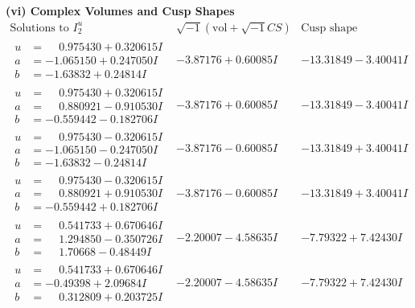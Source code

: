 \documentclass[1p]{elsarticle_modified}
\theoremstyle{definition}
\newcommand{\I}{\sqrt{-1}}
\begin{document}
\newpage\flushleft \textbf{(vi) Complex Volumes and Cusp Shapes}
$$\begin{array}{c|c|c}  
\text{Solutions to }I^u_{2}& \I (\text{vol} + \sqrt{-1}CS) & \text{Cusp shape}\\
 \hline 
\begin{aligned}
u &= \phantom{-}0.975430 + 0.320615 I \\
a &= -1.065150 + 0.247050 I \\
b &= -1.63832 + 0.24814 I\end{aligned}
 & -3.87176 + 0.60085 I & -13.31849 - 3.40041 I \\ \hline\begin{aligned}
u &= \phantom{-}0.975430 + 0.320615 I \\
a &= \phantom{-}0.880921 - 0.910530 I \\
b &= -0.559442 - 0.182706 I\end{aligned}
 & -3.87176 + 0.60085 I & -13.31849 - 3.40041 I \\ \hline\begin{aligned}
u &= \phantom{-}0.975430 - 0.320615 I \\
a &= -1.065150 - 0.247050 I \\
b &= -1.63832 - 0.24814 I\end{aligned}
 & -3.87176 - 0.60085 I & -13.31849 + 3.40041 I \\ \hline\begin{aligned}
u &= \phantom{-}0.975430 - 0.320615 I \\
a &= \phantom{-}0.880921 + 0.910530 I \\
b &= -0.559442 + 0.182706 I\end{aligned}
 & -3.87176 - 0.60085 I & -13.31849 + 3.40041 I \\ \hline\begin{aligned}
u &= \phantom{-}0.541733 + 0.670646 I \\
a &= \phantom{-}1.294850 - 0.350726 I \\
b &= \phantom{-}1.70668 - 0.48449 I\end{aligned}
 & -2.20007 - 4.58635 I & -7.79322 + 7.42430 I \\ \hline\begin{aligned}
u &= \phantom{-}0.541733 + 0.670646 I \\
a &= -0.49398 + 2.09684 I \\
b &= \phantom{-}0.312809 + 0.203725 I\end{aligned}
 & -2.20007 - 4.58635 I & -7.79322 + 7.42430 I \\ \hline\begin{aligned}

\end{aligned}
\end{array}$$
\end{document}
